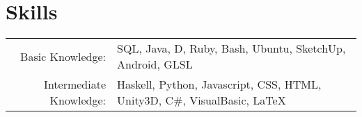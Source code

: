 \section{Skills}
\begin{tabular}{r p{12cm}<{\hfill}}
	Basic Knowledge:	&	SQL, Java, D, Ruby, Bash, Ubuntu, SketchUp, Android, GLSL  \\
	Intermediate Knowledge: &	Haskell, Python, Javascript, CSS, HTML, Unity3D, C\#, VisualBasic, \LaTeX \\
\end{tabular}
